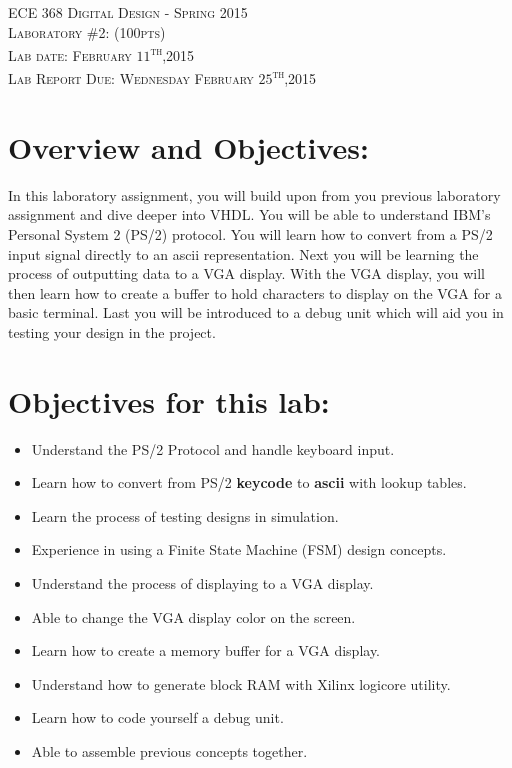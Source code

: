 \documentclass{article}
\begin{document}
\begin{center}
\textsc{\huge ECE 368 Digital Design - Spring 2015}\\[1cm]
\textsc{{\LARGE Laboratory \#2: (100pts)}}\\[0.5cm]
\textsc{\Large Lab date: February $11$\textsuperscript{th},2015}\\[0.5cm]
\textsc{\Large Lab Report Due: Wednesday February $25$\textsuperscript{th},2015}\\[1cm]
\end{center}

\section{Overview and Objectives:}
In this laboratory assignment, you will build upon from you previous laboratory assignment and dive deeper into VHDL. You will be able to understand IBM's Personal System 2 (PS/2) protocol. You will learn how to convert from a PS/2 input signal directly to an ascii representation. Next you will be learning the process of outputting data to a VGA display. With the VGA display, you will then learn how to create a buffer to hold characters to display on the VGA for a basic terminal. Last you will be introduced to a debug unit which will aid you in testing your design in the project.

\section{Objectives for this lab:}
\begin{itemize}
  \item Understand the PS/2 Protocol and handle keyboard input.
  \item Learn how to convert from PS/2 \textbf{keycode} to \textbf{ascii} with lookup tables.
  \item Learn the process of testing designs in simulation.
  \item Experience in using a Finite State Machine (FSM) design concepts.
  \item Understand the process of displaying to a VGA display.
  \item Able to change the VGA display color on the screen.
  \item Learn how to create a memory buffer for a VGA display.
  \item Understand how to generate block RAM with Xilinx\textsuperscript{\textregistered} logicore utility.
  \item Learn how to code yourself a debug unit.
  \item Able to assemble previous concepts together.
\end{itemize}
\end{document}
